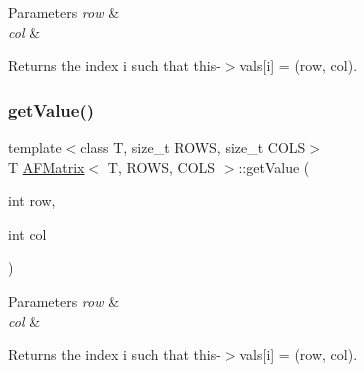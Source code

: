 \begin{DoxyParams}{Parameters}
{\em row} & \\
\hline
{\em col} & \\
\hline
\end{DoxyParams}
\begin{DoxyReturn}{Returns}
the index {\ttfamily i} such that {\ttfamily this-\/$>$vals\mbox{[}i\mbox{]} = (row, col)}. 
\end{DoxyReturn}
\mbox{\label{class_a_f_matrix_a0e36b5c6f333ac3d6508d5b00c92852c}} 
\subsubsection{\texorpdfstring{get\+Value()}{getValue()}}
{\footnotesize\ttfamily template$<$class T, size\+\_\+t R\+O\+WS, size\+\_\+t C\+O\+LS$>$ \\
T \hyperlink{class_a_f_matrix}{A\+F\+Matrix}$<$ T, R\+O\+WS, C\+O\+LS $>$\+::get\+Value (\begin{DoxyParamCaption}\item[{int}]{row,  }\item[{int}]{col }\end{DoxyParamCaption})\hspace{0.3cm}{\ttfamily [inline]}}


\begin{DoxyParams}{Parameters}
{\em row} & \\
\hline
{\em col} & \\
\hline
\end{DoxyParams}
\begin{DoxyReturn}{Returns}
the index {\ttfamily i} such that {\ttfamily this-\/$>$vals\mbox{[}i\mbox{]} = (row, col)}. 
\end{DoxyReturn}
\mbox{\label{class_a_f_matrix_a2c3183f964593d1bc52f6dc09429dbcc}} 
